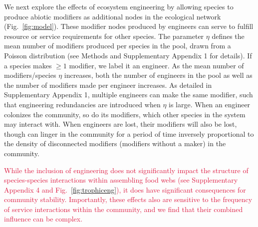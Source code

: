 \documentclass[twocolumn,preprintnumbers,amsmath,amssymb,superscriptaddress,linenumbers]{revtex4-1}
\newcommand{\rev}[1]{\textcolor{crimson}{#1}}
\begin{document}
We next explore the effects of ecosystem engineering by allowing species to produce abiotic modifiers as additional nodes in the ecological network (Fig.\ \ref{fig:model}).
These modifier nodes produced by engineers can serve to fulfill resource or service requirements for other species.
The parameter $\eta$ defines the mean number of modifiers produced per species in the pool, drawn from a Poisson distribution (see Methods and Supplementary Appendix 1 for details).
If a species makes $\geq 1$ modifier, we label it an engineer.
As the mean number of modifiers/species $\eta$ increases, both the number of engineers in the pool as well as the number of modifiers made per engineer increases.
As detailed in Supplementary Appendix 1, multiple engineers can make the same modifier, such that engineering redundancies are introduced when $\eta$ is large.
When an engineer colonizes the community, so do its modifiers, which other species in the system may interact with.
When engineers are lost, their modifiers will also be lost, though can linger in the community for a period of time inversely proportional to the density of disconnected modifiers (modifiers without a maker) in the community.






\rev{While the inclusion of engineering does not significantly impact the structure of species-species interactions within assembling food webs (see Supplementary Appendix 4 and Fig.\ \ref{fig:trophiceng}), it does have significant consequences for community stability.
Importantly, these effects also are sensitive to the frequency of service interactions within the community, and we find that their combined influence can be complex.}
\end{document}
